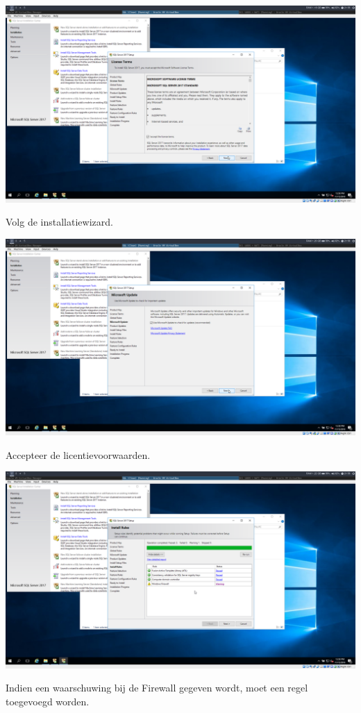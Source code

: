 \documentclass[a4paper]{article}
\begin{document}
\begin{center}
	\includegraphics[width=15cm]{Pictures/SQL/1542315502.png}
	
	Volg de installatiewizard.
\end{center}
\begin{center}
	\includegraphics[width=15cm]{Pictures/SQL/1542315511.png}
	
	Accepteer de licentievoorwaarden.
\end{center}
\begin{center}
	\includegraphics[width=15cm]{Pictures/SQL/1542315538.png}
	
	Indien een waarschuwing bij de Firewall gegeven wordt, moet een regel toegevoegd worden.
\end{center}
\end{document}
